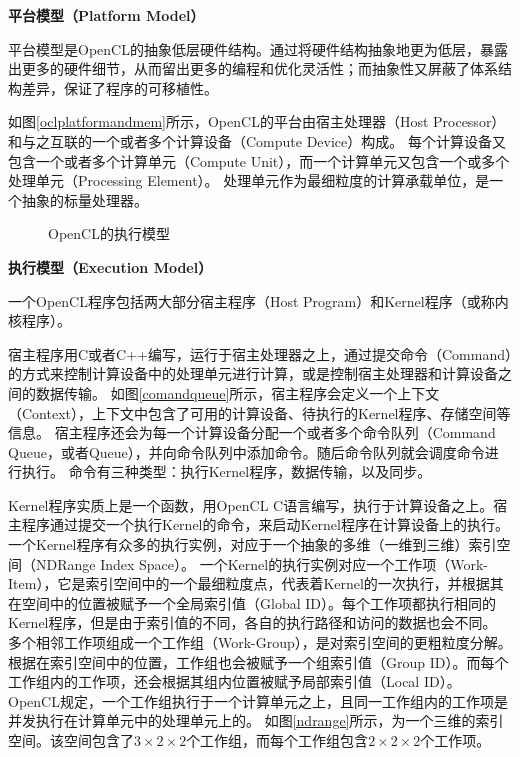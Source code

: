 \begin{compactitem}
\item \textbf{平台模型（Platform Model）}
\end{compactitem}

平台模型是OpenCL的抽象低层硬件结构。通过将硬件结构抽象地更为低层，暴露出更多的硬件细节，从而留出更多的编程和优化灵活性；而抽象性又屏蔽了体系结构差异，保证了程序的可移植性。

如图\ref{oclplatformandmem}所示，OpenCL的平台由宿主处理器（Host Processor）和与之互联的一个或者多个计算设备（Compute Device）构成。
每个计算设备又包含一个或者多个计算单元（Compute Unit），而一个计算单元又包含一个或多个处理单元（Processing Element）。
处理单元作为最细粒度的计算承载单位，是一个抽象的标量处理器。

\begin{figure}[htb]
  \centering
  \hspace{0.2cm}
  \caption{OpenCL的执行模型}
  \label{oclexecution}
\end{figure}

\begin{compactitem}
\item \textbf{执行模型（Execution Model）}
\end{compactitem}

一个OpenCL程序包括两大部分\pozhehao 宿主程序（Host Program）和Kernel程序（或称内核程序）。

宿主程序用C或者C++编写，运行于宿主处理器之上，通过提交命令（Command）的方式来控制计算设备中的处理单元进行计算，或是控制宿主处理器和计算设备之间的数据传输。
如图\ref{comandqueue}所示，宿主程序会定义一个上下文（Context），上下文中包含了可用的计算设备、待执行的Kernel程序、存储空间等信息。
宿主程序还会为每一个计算设备分配一个或者多个命令队列（Command Queue，或者Queue），并向命令队列中添加命令。随后命令队列就会调度命令进行执行。
命令有三种类型：执行Kernel程序，数据传输，以及同步。

Kernel程序实质上是一个函数，用OpenCL C语言编写，执行于计算设备之上。宿主程序通过提交一个执行Kernel的命令，来启动Kernel程序在计算设备上的执行。
一个Kernel程序有众多的执行实例，对应于一个抽象的多维（一维到三维）索引空间（NDRange Index Space）。
一个Kernel的执行实例对应一个工作项（Work-Item），它是索引空间中的一个最细粒度点，代表着Kernel的一次执行，并根据其在空间中的位置被赋予一个全局索引值（Global ID）。每个工作项都执行相同的Kernel程序，但是由于索引值的不同，各自的执行路径和访问的数据也会不同。
多个相邻工作项组成一个工作组（Work-Group），是对索引空间的更粗粒度分解。根据在索引空间中的位置，工作组也会被赋予一个组索引值（Group ID）。而每个工作组内的工作项，还会根据其组内位置被赋予局部索引值（Local ID）。
OpenCL规定，一个工作组执行于一个计算单元之上，且同一工作组内的工作项是并发执行在计算单元中的处理单元上的。
如图\ref{ndrange}所示，为一个三维的索引空间。该空间包含了$3\times2\times2$个工作组，而每个工作组包含$2\times2\times2$个工作项。

